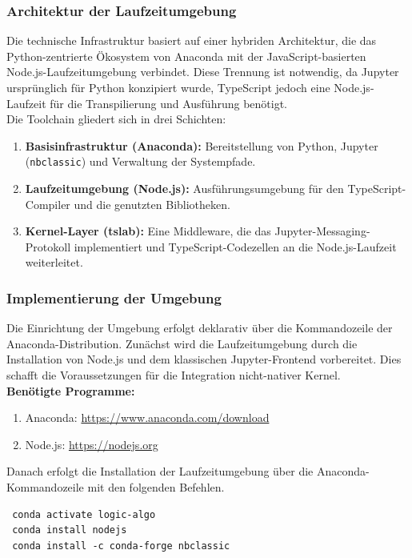 \subsubsection{Architektur der Laufzeitumgebung}
Die technische Infrastruktur basiert auf einer hybriden Architektur, die das Python-zentrierte Ökosystem von Anaconda mit der JavaScript-basierten Node.js-Laufzeitumgebung verbindet. Diese Trennung ist notwendig, da Jupyter ursprünglich für Python konzipiert wurde, TypeScript jedoch eine Node.js-Laufzeit für die Transpilierung und Ausführung benötigt.\\
Die Toolchain gliedert sich in drei Schichten:
\begin{enumerate}
	\item \textbf{Basisinfrastruktur (Anaconda):} Bereitstellung von Python, Jupyter (\texttt{nbclassic}) und Verwaltung der Systempfade.
	\item \textbf{Laufzeitumgebung (Node.js):} Ausführungsumgebung für den TypeScript-Compiler und die genutzten Bibliotheken.
	\item \textbf{Kernel-Layer (tslab):} Eine Middleware, die das Jupyter-Messaging-Protokoll implementiert und TypeScript-Codezellen an die Node.js-Laufzeit weiterleitet.
\end{enumerate}

\subsubsection{Implementierung der Umgebung}
Die Einrichtung der Umgebung erfolgt deklarativ über die Kommandozeile der Anaconda-Distribution. Zunächst wird die Laufzeitumgebung durch die Installation von Node.js und dem klassischen Jupyter-Frontend vorbereitet. Dies schafft die Voraussetzungen für die Integration nicht-nativer Kernel. \\
\textbf{Benötigte Programme:}
\begin{enumerate}[noitemsep]
	\item Anaconda: \url{https://www.anaconda.com/download}
	\item Node.js: \url{https://nodejs.org}
\end{enumerate}

Danach erfolgt die Installation der Laufzeitumgebung über die Anaconda-Kommandozeile mit den folgenden Befehlen.
\begin{verbatim}
 conda activate logic-algo
 conda install nodejs
 conda install -c conda-forge nbclassic
\end{verbatim}

